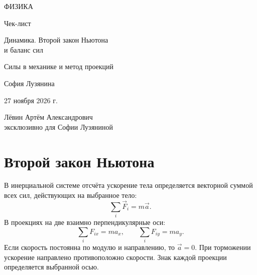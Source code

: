 \documentclass[a4paper,12pt]{article}
\begin{document}
\begin{titlepage}
\centering
\vspace*{28mm}
{\Large\textcolor{darkaccent}{ФИЗИКА}\par}
\vspace{14mm}
{\Huge Чек-лист\par}
\vspace{10mm}
{\LARGE\textcolor{accent}{Динамика. Второй закон Ньютона\\[2mm] и баланс сил}\par}
\vspace{14mm}
{\large Силы в механике и метод проекций\par}
\vfill
{\large София Лузянина\par}
\vspace{8mm}
27 ноября 2026 г.\par
\vspace{15mm}
{\small Лёвин Артём Александрович\\эксклюзивно для Софии Лузяниной\par}
\vspace{18mm}
\end{titlepage}
\setcounter{page}{1}
\section{Второй закон Ньютона}
В инерциальной системе отсчёта ускорение тела определяется векторной суммой всех сил, действующих на выбранное тело:
\[\sum_i\vec F_i=m\vec a.\]
В проекциях на две взаимно перпендикулярные оси:
\[\sum_i F_{ix}=ma_x,\qquad \sum_i F_{iy}=ma_y.\]
Если скорость постоянна по модулю и направлению, то $\vec a=0$. При торможении ускорение направлено противоположно скорости. Знак каждой проекции определяется выбранной осью.
\end{document}

